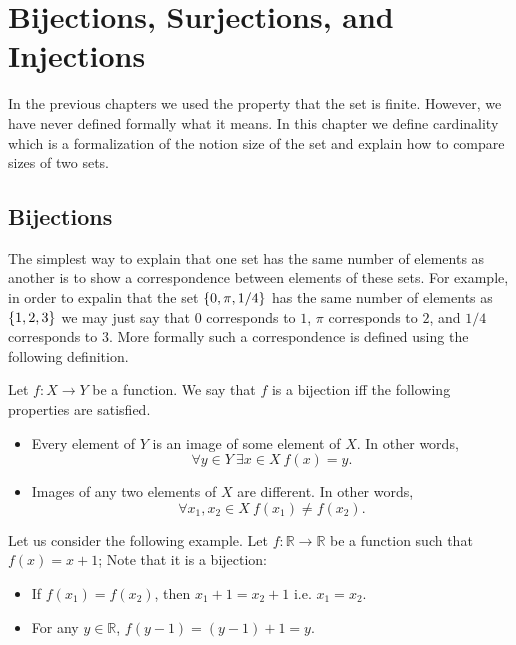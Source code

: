 \chapter{Bijections, Surjections, and Injections}
\label{chapter:bijections-surjections-injections}

In the previous chapters we used the property that the set is finite. However,
we have never defined formally what it means. In this chapter we define
cardinality which is a formalization of the notion size of the set and explain
how to compare sizes of two sets.

\section{Bijections}
The simplest way to explain that one set has the same number of elements as
another is to show a correspondence between elements of these sets. For example,
in order to expalin that the set $\set{0, \pi, 1 / 4}$ has the same number of
elements as $\set{1, 2, 3}$ we may just say that $0$ corresponds to $1$,
$\pi$ corresponds to $2$, and $1 / 4$ corresponds to $3$. More formally such a
correspondence is defined using the following definition.
\begin{definition}
  Let $f : X \to Y$ be a function. We say that $f$ is a bijection iff the
  following properties are satisfied.
  \begin{itemize}
    \item Every element of $Y$ is an image of some element of $X$. In other
    words,
      \[
          \forall y \in Y~\exists x \in X\ f(x) = y.
      \]
    \item Images of any two elements
      of $X$ are different. In other words,
      \[
          \forall x_1, x_2 \in X\ f(x_1) \neq f(x_2).
      \]
    \end{itemize}
\end{definition}

Let us consider the following example. Let $f : \mathbb{R} \to \mathbb{R}$ be a
function such that $f(x) = x + 1$; Note that it is a bijection:
\begin{itemize}
  \item If $f(x_1) = f(x_2)$, then $x_1 + 1 = x_2 + 1$ i.e. $x_1 = x_2$.
  \item For any $y \in \mathbb{R}$, $f(y - 1) = (y - 1) + 1 = y$.
\end{itemize}



